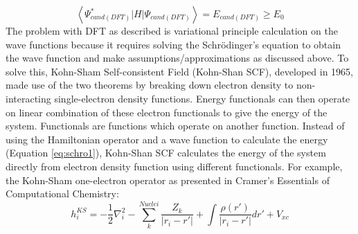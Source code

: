 \documentclass[
journal=jpcbfk, %
manuscript=article]{achemso}
\begin{document}
	\begin{equation}
	\label{eq:HK2}
	\left  \langle \Psi_{cand (DFT)}^{*} \left | H \right | \Psi_{cand (DFT)} \right \rangle = E_{cand (DFT)}\geq E_{0} 
	\end{equation}
	The problem with DFT as described is variational principle calculation on the wave functions because it requires solving the Schr\"odinger's equation to obtain the wave function and make assumptions/approximations as discussed above. To solve this, Kohn-Sham Self-consistent Field (Kohn-Shan SCF), developed in 1965, made use of the two theorems by breaking down electron density to non-interacting single-electron density functions.\cite{Kohn1965} Energy functionals can then operate on linear combination of these electron functionals to give the energy of the system. Functionals are functions which operate on another function. Instead of using the Hamiltonian operator and a wave function to calculate the energy (Equation \ref{eq:schro1}), Kohn-Shan SCF calculates the energy of the system directly from electron density function using different functionals. For example, the Kohn-Sham one-electron operator as presented in Cramer's Essentials of Computational Chemistry\cite{Cramer2005}: 
	\begin{equation}
	\label{eq:KSH}
	h_{i}^{KS}=-\frac{1}{2}\nabla_{i}^{2}-\sum_{k}^{Nuclei}\frac{Z_{k}}{\left | r_{i}-r' \right |}+\int \frac{\rho(r')}{\left | r_{i}-r' \right |}dr' +V_{xc}
	\end{equation}
\end{document}
